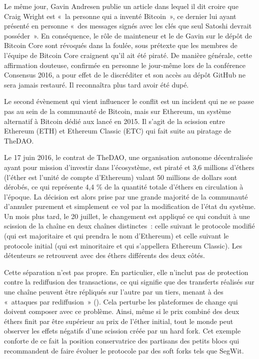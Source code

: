 Le même jour, Gavin Andresen publie un article dans lequel il dit croire que Craig Wright est «~la personne qui a inventé Bitcoin~», ce dernier lui ayant présenté en personne «~des messages signés avec les clés que seul Satoshi devrait posséder~». En conséquence, le rôle de mainteneur et le  de Gavin sur le dépôt de Bitcoin Core sont révoqués dans la foulée, sous prétexte que les membres de l'équipe de Bitcoin Core craignent qu'il ait été piraté. De manière générale, cette affirmation douteuse, confirmée en personne le jour-même lors de la conférence Consensus 2016, a pour effet de le discréditer et son accès au dépôt GitHub ne sera jamais restauré. Il reconnaîtra plus tard avoir été dupé.

Le second évènement qui vient influencer le conflit est un incident qui ne se passe pas au sein de la communauté de Bitcoin, mais sur Ethereum, un système alternatif à Bitcoin dédié aux  lancé en 2015. Il s'agit de la scission entre Ethereum (ETH) et Ethereum Classic (ETC) qui fait suite au piratage de TheDAO. %

Le 17 juin 2016, le contrat de TheDAO, une organisation autonome décentralisée ayant pour mission d'investir dans l'écosystème, est piraté et 3,6 millions d'éthers (l'éther est l'unité de compte d'Ethereum) valant 50 millions de dollars sont dérobés, ce qui représente 4,4 \% de la quantité totale d'éthers en circulation à l'époque. La décision est alors prise par une grande majorité de la communauté d'annuler purement et simplement ce vol par la modification de l'état du système. Un mois plus tard, le 20 juillet, le changement est appliqué ce qui conduit à une scission de la chaîne en deux chaînes distinctes~: celle suivant le protocole modifié (qui est majoritaire et qui prendra le nom d'Ethereum) et celle suivant le protocole initial (qui est minoritaire et qui s'appellera Ethereum Classic). Les détenteurs se retrouvent avec des éthers différents des deux côtés.

Cette séparation n'est pas propre. En particulier, elle n'inclut pas de protection contre la rediffusion des transactions, ce qui signifie que des transferts réalisés sur une chaîne peuvent être répliqués sur l'autre par un tiers, menant à des «~attaques par rediffusion~» (). Cela perturbe les plateformes de change qui doivent composer avec ce problème. Ainsi, même si le prix combiné des deux éthers finit par être supérieur au prix de l'éther initial, tout le monde peut observer les effets négatifs d'une scission créée par un hard fork. Cet exemple conforte de ce fait la position conservatrice des partisans des petits blocs qui recommandent de faire évoluer le protocole par des soft forks tels que SegWit.

